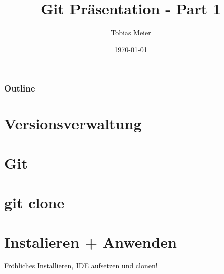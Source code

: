 \documentclass{beamer}
\title{Git Präsentation - Part 1}
\author{Tobias Meier}
\institute{GDW Orga}
\date{\today}
\begin{document}
\begin{frame}
\titlepage
\end{frame}

\begin{frame}
\frametitle{Outline}
\tableofcontents[pausesections]
\end{frame}

\section{Versionsverwaltung}


\section{Git}


\section{git clone}


\section{Instalieren + Anwenden}
\begin{frame}
	Fröhliches Installieren, IDE aufsetzen und clonen!
\end{frame}
\end{document}
